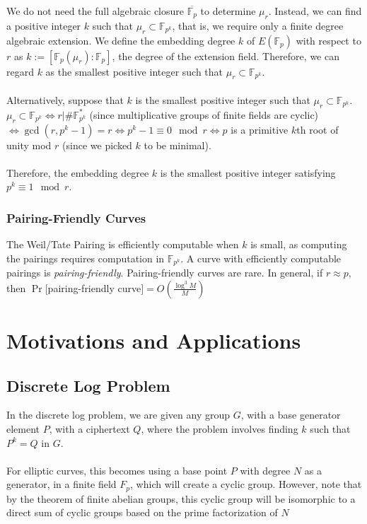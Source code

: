 \documentclass[12pt,twoside]{article}
\begin{document}
We do not need the full algebraic closure $\overline{\mathbb F_p}$ to determine $\mu_r$. Instead, we can find a positive integer $k$ such that $\mu_r \subset \mathbb F_{p^k}$, that is, we require only a finite degree algebraic extension. We define the embedding degree $k$ of $E(\mathbb F_p)$ with respect to $r$ as $k:= [\mathbb F_p(\mu_r) : \mathbb F_p]$, the degree of the extension field. Therefore, we can regard $k$ as the smallest positive integer such that $\mu_r \subset \mathbb F_{p^k}$.
\\ \\
\noindent Alternatively, suppose that $k$ is the smallest positive integer such that $\mu_r \subset \mathbb F_{p^k}$.  $\mu_r \subset \mathbb F_{p^k} \iff r \Big |  \# \mathbb F^*_{p^k}$ (since multiplicative groups of finite fields are cyclic) $ \iff \gcd(r, p^k-1) = r \iff p^k-1 \equiv 0 \mod r \iff p$ is a primitive $k$th root of unity mod $r$ (since we picked $k$ to be minimal). 
\\ \\
\noindent Therefore, the embedding degree $k$ is the smallest positive integer satisfying $p^k \equiv 1 \mod r$.

\subsubsection{Pairing-Friendly Curves}
The Weil/Tate Pairing is efficiently computable when $k$ is small, as computing the pairings requires computation in $\mathbb F_{p^k}$. A curve with efficiently computable pairings is {\it pairing-friendly}. Pairing-friendly curves are rare. In general, if $r \approx p$, then $\Pr[$pairing-friendly curve$] = O(\frac{\log^3 M}{M})$

\section{Motivations and Applications} 

\subsection{Discrete Log Problem}
In the discrete log problem, we are given any group $G$, with a base generator element $P$, with a ciphertext $Q$, where the problem involves finding $k$ such that $P^{k} = Q$ in $G$. \\ \\
For elliptic curves, this becomes using a base point $P$ with degree $N$ as a generator, in a finite field $F_{p}$, which will create a cyclic group. However, note that by the theorem of finite abelian groups, this cyclic group will be isomorphic to a direct sum of cyclic groups based on the prime factorization of $N$
\end{document}
